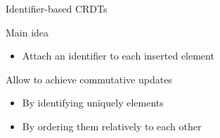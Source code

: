 \documentclass[10pt]{beamer}
\begin{document}










\begin{frame}{Identifier-based \acp{CRDT}}
  \begin{block}{Main idea}
    \begin{itemize}
      \item Attach an identifier to each inserted element
    \end{itemize}
  \end{block}

  \bigskip

  \begin{block}{Allow to achieve commutative updates}
    \begin{itemize}
      \item By identifying uniquely elements
      \item By ordering them relatively to each other
    \end{itemize}
  \end{block}
\end{frame}
\end{document}
